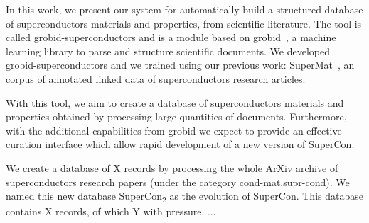 \documentclass{article}
\begin{document}
In this work, we present our system for automatically build a structured database of superconductors materials and properties, from scientific literature. The tool is called grobid-superconductors and is a module based on grobid~\cite{GROBID}, a machine learning library to parse and structure scientific documents. 
We developed grobid-superconductors and we trained using our previous work: SuperMat~\cite{foppiano2020supermat}, an corpus of annotated linked data of superconductors research articles.


With this tool, we aim to create a database of superconductors materials and properties obtained by processing large quantities of documents. Furthermore, with the additional capabilities from grobid we expect to provide an effective curation interface which allow rapid development of a new version of SuperCon. 


We create a database of X records by processing the whole ArXiv archive of superconductors research papers (under the category cond-mat.supr-cond). 
We named this new database  SuperCon\textsubscript{2} as the evolution of SuperCon. 
This database contains X records, of which Y with pressure. ...



\end{document}
